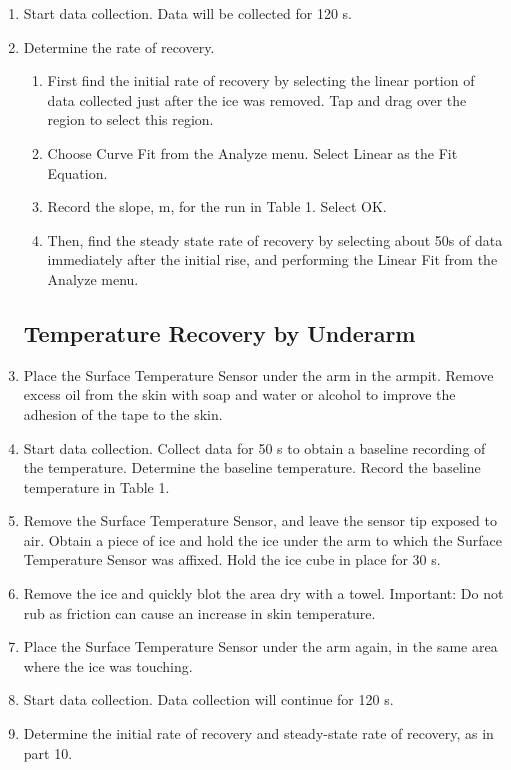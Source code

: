 \documentclass[12pt,oneside]{article}
\begin{document}
\begin{enumerate}
\item	Start data collection. Data will be collected for 120 s. 
\item	Determine the rate of recovery.
\begin{enumerate}
\item	First find the initial rate of recovery by selecting the linear portion of data collected just after the ice was removed. Tap and drag over the region to select this region. 
\item	Choose Curve Fit from the Analyze menu. Select Linear as the Fit Equation. 
\item	Record the slope, m, for the run in Table 1. Select OK.
\item	Then, find the steady state rate of recovery by selecting about 50s of data immediately after the initial rise, and performing the Linear Fit from the Analyze menu.
\end{enumerate}

\subsection{Temperature Recovery by Underarm}
\item		Place the Surface Temperature Sensor under the arm in the armpit. Remove excess oil from the skin with soap and water or alcohol to improve the adhesion of the tape to the skin. 
\item		Start data collection. Collect data for 50 s to obtain a baseline recording of the temperature. Determine the baseline temperature. Record the baseline temperature in Table 1.
\item		Remove the Surface Temperature Sensor, and leave the sensor tip exposed to air. Obtain a piece of ice and hold the ice under the arm to which the Surface Temperature Sensor was affixed. Hold the ice cube in place for 30 s.
\item		Remove the ice and quickly blot the area dry with a towel. Important: Do not rub as friction can cause an increase in skin temperature.
\item		Place the Surface Temperature Sensor under the arm again, in the same area where the ice was touching.
\item		Start data collection. Data collection will continue for 120 s.
\item		Determine the initial rate of recovery and steady-state rate of recovery, as in part 10.


\end{enumerate}
\end{document}
